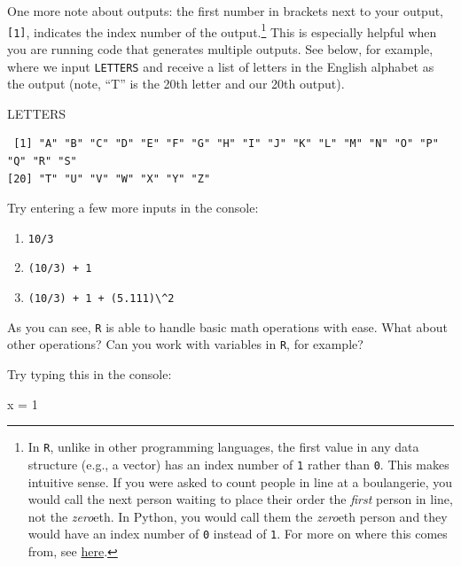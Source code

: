 \documentclass[
  letterpaper,
]{book}
\newenvironment{Shaded}{\begin{snugshade}}{\end{snugshade}}
\newcommand{\DecValTok}[1]{\textcolor[rgb]{0.68,0.00,0.00}{#1}}
\newcommand{\NormalTok}[1]{\textcolor[rgb]{0.00,0.23,0.31}{#1}}
\newcommand{\OtherTok}[1]{\textcolor[rgb]{0.00,0.23,0.31}{#1}}
\begin{document}
One more note about outputs: the first number in brackets next to your
output, \texttt{{[}1{]}}, indicates the index number of the
output.\footnote{In \texttt{R}, unlike in other programming languages,
  the first value in any data structure (e.g., a vector) has an index
  number of \texttt{1} rather than \texttt{0}. This makes intuitive
  sense. If you were asked to count people in line at a boulangerie, you
  would call the next person waiting to place their order the
  \emph{first} person in line, not the \emph{zero}eth. In Python, you
  would call them the \emph{zero}eth person and they would have an index
  number of \texttt{0} instead of \texttt{1}. For more on where this
  comes from, see
  \href{https://en.wikipedia.org/wiki/Zero-based_numbering}{here}.} This
is especially helpful when you are running code that generates multiple
outputs. See below, for example, where we input \texttt{LETTERS} and
receive a list of letters in the English alphabet as the output (note,
``T'' is the 20th letter and our 20th output).

\begin{Shaded}
\begin{Highlighting}[]
\NormalTok{LETTERS}
\end{Highlighting}
\end{Shaded}

\begin{verbatim}
 [1] "A" "B" "C" "D" "E" "F" "G" "H" "I" "J" "K" "L" "M" "N" "O" "P" "Q" "R" "S"
[20] "T" "U" "V" "W" "X" "Y" "Z"
\end{verbatim}

Try entering a few more inputs in the console:

\begin{enumerate}
\def\labelenumi{\arabic{enumi}.}
\item
  \texttt{10/3}
\item
  \texttt{(10/3)\ +\ 1}
\item
  \texttt{(10/3)\ +\ 1\ +\ (5.111)\textbackslash{}\^{}2}
\end{enumerate}

As you can see, \texttt{R} is able to handle basic math operations with
ease. What about other operations? Can you work with variables in
\texttt{R}, for example?

Try typing this in the console:

\begin{Shaded}
\begin{Highlighting}[]
\NormalTok{x }\OtherTok{=} \DecValTok{1}
\end{Highlighting}
\end{Shaded}
\end{document}
